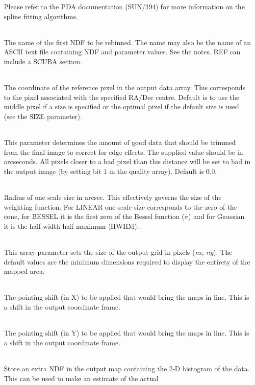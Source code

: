 \documentclass[twoside,11pt]{article}
\newcommand{\htmlref}[2]{#1}
\newcommand{\xref}[3]{#1}
\renewcommand{\_}{\texttt{\symbol{95}}}
\newcommand{\sstsubsection}[1]{ \item[{#1}] \mbox{} \\}
\newcommand{\sstsubsection}[1]{\item[{#1}]}
\begin{document}
{{{{         }
         Please refer to the PDA documentation 
         (\xref{SUN/194}{sun194}{}) for more information
         on the spline fitting algorithms.
      }
      \sstsubsection{
         REF = CHAR (Read)
      }{
         The name of the first NDF to be rebinned. The name may also be the
         name of an ASCII text file containing NDF and parameter values.
         See the notes. REF can include a \htmlref{SCUBA section}{sections}.
      }
      \sstsubsection{
         REFPIX ( 2 ) = INTEGER (Read)
      }{
         The coordinate of the reference pixel in the output data
         array. This corresponds to the pixel associated with the
         specified RA/Dec centre. Default is to use the middle pixel
         if a size is specified or the optimal pixel if the default
         size is used (see the SIZE parameter).
      }
      \sstsubsection{
         TRIM = INTEGER (Read)
      }{
        This parameter determines the amount of good data that should
        be trimmed from the final image to correct for edge effects.
        The supplied value should be in arcseconds. All pixels closer
        to a bad pixel than this distance will be set to bad in the
        output image (by setting bit 1 in the quality array). 
        Default is 0.0.
      }
      \sstsubsection{
         SCALE = REAL (Read)
      }{
         Radius of one scale size in arcsec. This effectively governs the
         size of the weighting function. For LINEAR one scale size corresponds
         to the zero of the cone, for BESSEL it is the first zero of the
         Bessel function ($\pi$) and for Gaussian it is the half-width
         half maximum (HWHM).
      }
      \sstsubsection{
         SIZE ( 2 ) = INTEGER (Read)
      }{
         This array parameter sets the size of the output grid in pixels
         (\textit{nx}, \textit{ny}). The default values are the minimum
         dimensions required to display the entirety of the mapped area.
      }
      \sstsubsection{
         SHIFT\_DX = REAL (Read)
      }{
         The pointing shift (in X) to be applied that would bring the
         maps in line. This is a shift in the output coordinate frame.
      }
      \sstsubsection{
         SHIFT\_DY = REAL (Read)
      }{
         The pointing shift (in Y) to be applied that would bring the
         maps in line. This is a shift in the output coordinate frame.
      }
      \sstsubsection{
         TIMES = LOGICAL (Read)
      }{
         Store an extra NDF in the output map containing the 2-D histogram
         of the data. This can be used to make an estimate of the actual
}}}
\end{document}
